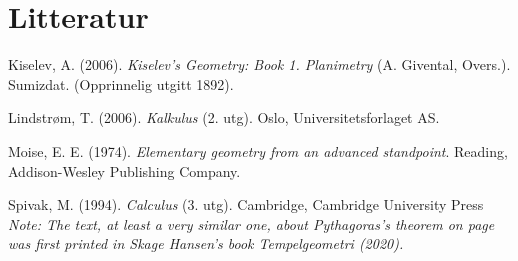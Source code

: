 



\chapter*{Litteratur}
Kiselev, A. (2006). \textit{Kiselev's Geometry: Book 1. Planimetry} (A. Givental, Overs.). Sumizdat. (Opprinnelig utgitt 1892).\vsk

Lindstrøm, T. (2006). \textit{Kalkulus} (2. utg). Oslo, Universitetsforlaget AS.\vsk

Moise, E. E. (1974). \textit{Elementary geometry from an advanced standpoint}. Reading, Addison-Wesley Publishing Company.\vsk

Spivak, M. (1994). \textit{Calculus} (3. utg). Cambridge, Cambridge University Press
\vfill
\textit{\footnotesize Note: The text, at least a very similar one, about Pythagoras's theorem on page \pageref{pytforklaringintro} was first printed in Skage Hansen's book \textit{Tempelgeometri} (2020).}
\newpage
